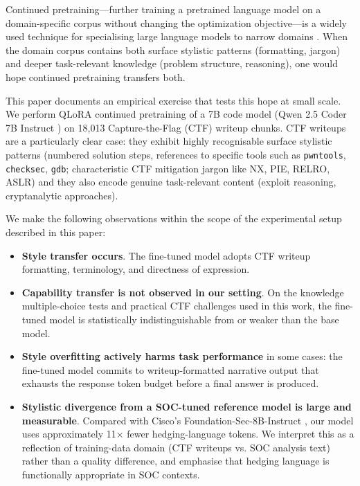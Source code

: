 \documentclass[10pt,twocolumn,a4paper]{article}
\begin{document}
Continued pretraining---further training a pretrained language model on a domain-specific corpus without changing the optimization objective---is a widely used technique for specialising large language models to narrow domains \cite{gururangan2020dont}. When the domain corpus contains both surface stylistic patterns (formatting, jargon) and deeper task-relevant knowledge (problem structure, reasoning), one would hope continued pretraining transfers both.

This paper documents an empirical exercise that tests this hope at small scale. We perform QLoRA \cite{dettmers2023qlora} continued pretraining of a 7B code model (Qwen 2.5 Coder 7B Instruct \cite{hui2024qwen25coder}) on 18{,}013 Capture-the-Flag (CTF) writeup chunks. CTF writeups are a particularly clear case: they exhibit highly recognisable surface stylistic patterns (numbered solution steps, references to specific tools such as \texttt{pwntools}, \texttt{checksec}, \texttt{gdb}; characteristic CTF mitigation jargon like NX, PIE, RELRO, ASLR) and they also encode genuine task-relevant content (exploit reasoning, cryptanalytic approaches).

We make the following observations within the scope of the experimental setup described in this paper:

\begin{itemize}
\item \textbf{Style transfer occurs}. The fine-tuned model adopts CTF writeup formatting, terminology, and directness of expression.
\item \textbf{Capability transfer is not observed in our setting}. On the knowledge multiple-choice tests and practical CTF challenges used in this work, the fine-tuned model is statistically indistinguishable from or weaker than the base model.
\item \textbf{Style overfitting actively harms task performance} in some cases: the fine-tuned model commits to writeup-formatted narrative output that exhausts the response token budget before a final answer is produced.
\item \textbf{Stylistic divergence from a SOC-tuned reference model is large and measurable}. Compared with Cisco's Foundation-Sec-8B-Instruct \cite{cisco2025foundationsec}, our model uses approximately 11$\times$ fewer hedging-language tokens. We interpret this as a reflection of training-data domain (CTF writeups vs. SOC analysis text) rather than a quality difference, and emphasise that hedging language is functionally appropriate in SOC contexts.
\end{itemize}
\end{document}
